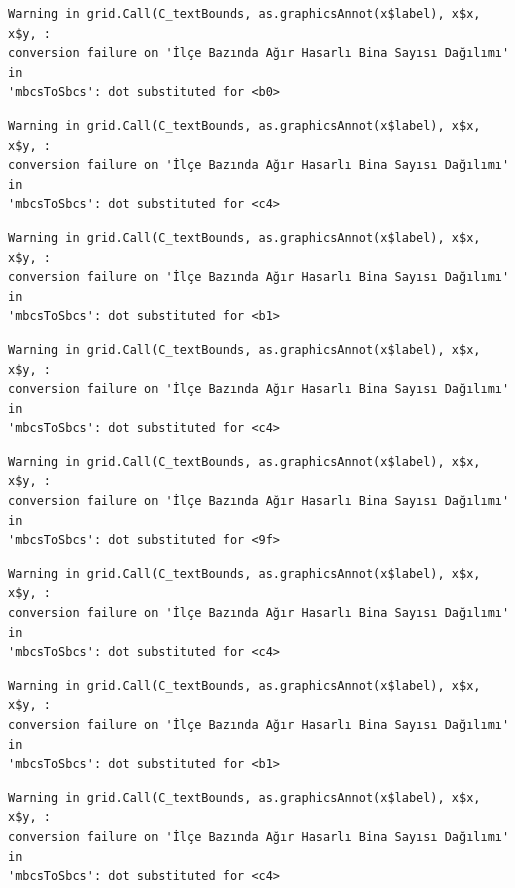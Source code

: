 \documentclass[
  11pt,
  a4paper,
  DIV=11,
  numbers=noendperiod]{scrartcl}
\begin{document}
\begin{verbatim}
Warning in grid.Call(C_textBounds, as.graphicsAnnot(x$label), x$x, x$y, :
conversion failure on 'İlçe Bazında Ağır Hasarlı Bina Sayısı Dağılımı' in
'mbcsToSbcs': dot substituted for <b0>
\end{verbatim}

\begin{verbatim}
Warning in grid.Call(C_textBounds, as.graphicsAnnot(x$label), x$x, x$y, :
conversion failure on 'İlçe Bazında Ağır Hasarlı Bina Sayısı Dağılımı' in
'mbcsToSbcs': dot substituted for <c4>
\end{verbatim}

\begin{verbatim}
Warning in grid.Call(C_textBounds, as.graphicsAnnot(x$label), x$x, x$y, :
conversion failure on 'İlçe Bazında Ağır Hasarlı Bina Sayısı Dağılımı' in
'mbcsToSbcs': dot substituted for <b1>
\end{verbatim}

\begin{verbatim}
Warning in grid.Call(C_textBounds, as.graphicsAnnot(x$label), x$x, x$y, :
conversion failure on 'İlçe Bazında Ağır Hasarlı Bina Sayısı Dağılımı' in
'mbcsToSbcs': dot substituted for <c4>
\end{verbatim}

\begin{verbatim}
Warning in grid.Call(C_textBounds, as.graphicsAnnot(x$label), x$x, x$y, :
conversion failure on 'İlçe Bazında Ağır Hasarlı Bina Sayısı Dağılımı' in
'mbcsToSbcs': dot substituted for <9f>
\end{verbatim}

\begin{verbatim}
Warning in grid.Call(C_textBounds, as.graphicsAnnot(x$label), x$x, x$y, :
conversion failure on 'İlçe Bazında Ağır Hasarlı Bina Sayısı Dağılımı' in
'mbcsToSbcs': dot substituted for <c4>
\end{verbatim}

\begin{verbatim}
Warning in grid.Call(C_textBounds, as.graphicsAnnot(x$label), x$x, x$y, :
conversion failure on 'İlçe Bazında Ağır Hasarlı Bina Sayısı Dağılımı' in
'mbcsToSbcs': dot substituted for <b1>
\end{verbatim}

\begin{verbatim}
Warning in grid.Call(C_textBounds, as.graphicsAnnot(x$label), x$x, x$y, :
conversion failure on 'İlçe Bazında Ağır Hasarlı Bina Sayısı Dağılımı' in
'mbcsToSbcs': dot substituted for <c4>
\end{verbatim}
\end{document}
